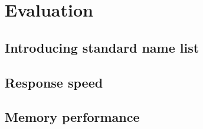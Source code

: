 \chapter{Evaluation}
\label{ch:evaluation}

\section{Introducing standard name list}
\label{sec:stdname}

\section{Response speed}

\section{Memory performance}
